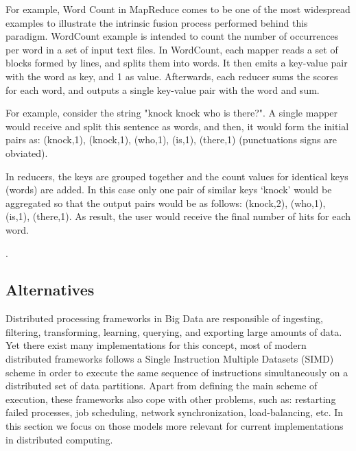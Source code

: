 \documentclass[3p,review]{elsarticle}
\begin{document}
For example, Word Count in MapReduce comes to be one of the most widespread examples to illustrate the intrinsic fusion process performed behind this paradigm. WordCount example is intended to count the number of occurrences per word in a set of input text files. 
In WordCount, each mapper reads a set of blocks formed by lines, and splits them into words.  It then emits a key-value pair with the word as key, and 1 as value. Afterwards, each reducer sums the scores for each word, and outputs a single key-value pair with the word and sum. 

For example, consider the string "knock knock who is there?". A single mapper would receive and split this sentence as words, and then, it would form the initial pairs as: (knock,1), (knock,1), (who,1), (is,1), (there,1) (punctuations signs are obviated).

In reducers, the keys are grouped together and the count values for identical keys (words) are added. In this case only one pair of similar keys `knock' would be aggregated so that the output pairs would be as follows: (knock,2), (who,1), (is,1), (there,1). As result, the user would receive the final number of hits for each word. 


\cite{zhang14b, rio14b, meng15, rio15b}.



\subsection{Alternatives}\label{subsec:altMR}

Distributed processing frameworks in Big Data are responsible of ingesting, filtering, transforming, learning, querying, and exporting large amounts of data. Yet there exist many implementations for this concept, most of modern distributed frameworks follows a Single Instruction Multiple Datasets (SIMD)~\cite{sung00} scheme in order to execute the same sequence of instructions simultaneously on a distributed set of data partitions. Apart from defining the main scheme of execution, these frameworks also cope with other problems, such as: restarting failed processes, job scheduling, network synchronization, load-balancing, etc. In this section we focus on those models more relevant for current implementations in distributed computing.
\end{document}
